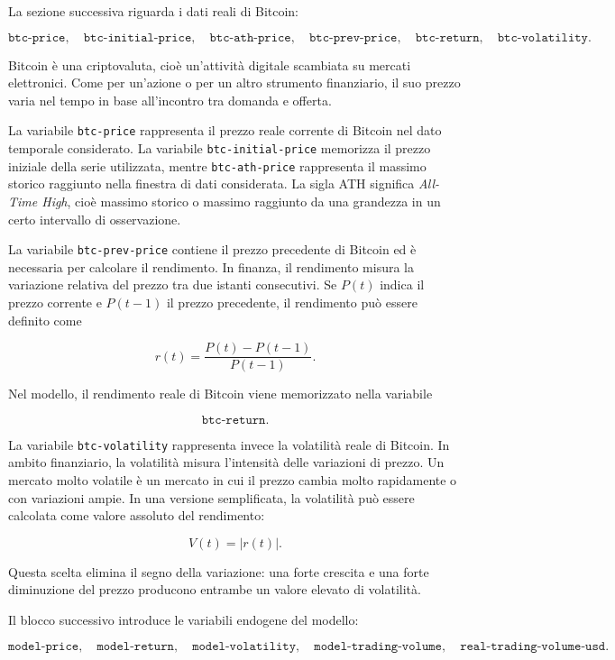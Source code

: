 La sezione successiva riguarda i dati reali di Bitcoin:

\[
\texttt{btc-price},
\quad
\texttt{btc-initial-price},
\quad
\texttt{btc-ath-price},
\quad
\texttt{btc-prev-price},
\quad
\texttt{btc-return},
\quad
\texttt{btc-volatility}.
\]

Bitcoin è una criptovaluta, cioè un'attività digitale scambiata su mercati
elettronici. Come per un'azione o per un altro strumento finanziario, il suo
prezzo varia nel tempo in base all'incontro tra domanda e offerta.

La variabile \texttt{btc-price} rappresenta il prezzo reale corrente di Bitcoin
nel dato temporale considerato. La variabile \texttt{btc-initial-price} memorizza
il prezzo iniziale della serie utilizzata, mentre \texttt{btc-ath-price}
rappresenta il massimo storico raggiunto nella finestra di dati considerata. La
sigla ATH significa \textit{All-Time High}, cioè massimo storico o massimo
raggiunto da una grandezza in un certo intervallo di osservazione.

La variabile \texttt{btc-prev-price} contiene il prezzo precedente di Bitcoin ed
è necessaria per calcolare il rendimento. In finanza, il rendimento misura la
variazione relativa del prezzo tra due istanti consecutivi. Se \(P(t)\) indica
il prezzo corrente e \(P(t-1)\) il prezzo precedente, il rendimento può essere
definito come

\[
r(t)=\frac{P(t)-P(t-1)}{P(t-1)}.
\]

Nel modello, il rendimento reale di Bitcoin viene memorizzato nella variabile

\[
\texttt{btc-return}.
\]

La variabile \texttt{btc-volatility} rappresenta invece la volatilità reale di
Bitcoin. In ambito finanziario, la volatilità misura l'intensità delle variazioni
di prezzo. Un mercato molto volatile è un mercato in cui il prezzo cambia molto
rapidamente o con variazioni ampie. In una versione semplificata, la volatilità
può essere calcolata come valore assoluto del rendimento:

\[
V(t)=|r(t)|.
\]

Questa scelta elimina il segno della variazione: una forte crescita e una forte
diminuzione del prezzo producono entrambe un valore elevato di volatilità.

Il blocco successivo introduce le variabili endogene del modello:

\[
\texttt{model-price},
\quad
\texttt{model-return},
\quad
\texttt{model-volatility},
\quad
\texttt{model-trading-volume},
\quad
\texttt{real-trading-volume-usd}.
\]

